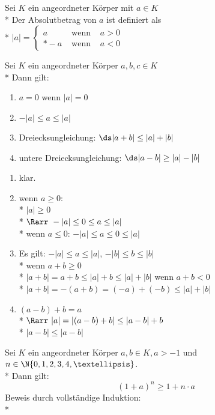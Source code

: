 	Sei $K$ ein angeordneter Körper mit $a \in K$\\*
	Der Absolutbetrag von $a$ ist definiert als \\*
	$|a| = \left\lbrace \begin{array}{rcr}
	a&\text{ wenn }&a > 0\\*
	-a&\text{ wenn }&a < 0
	\end{array}\right.$

	Sei $K$ ein angeordneter Körper $a, b, c \in K$\\*
	Dann gilt:
	\begin{enumerate}
	\item{$a = 0$ wenn $|a| = 0$}
	\item{$-|a| \leq a \leq |a|$}
	\item{Dreiecksungleichung: $\ds |a + b| \leq |a| + |b|$}
	\item{untere Dreiecksungleichung: $\ds |a - b| \geq |a| - |b|$}
	\end{enumerate}
\bew
	\begin{enumerate}
	\item{klar.}
	\item{wenn $a \geq 0$:\\*
	$|a| \geq 0$\\*
	$\Rarr\ -|a| \leq 0 \leq a \leq |a|$\\*
	wenn $a \leq 0$:
	$-|a| \leq a \leq 0 \leq |a|$}
	\item{Es gilt: $-|a| \leq a \leq |a|$, $-|b| \leq b \leq |b|$\\*
	wenn $a + b \geq 0$\\*
	$|a + b| = a + b \leq |a| + b \leq |a| + |b|$
	wenn $a + b < 0$\\*
	$|a + b| = -(a + b) = (-a) + (-b) \leq |a| + |b|$}
	\item{$(a - b) + b = a$\\*
	$\Rarr\ |a| = |(a - b) + b| \leq |a - b| + b$\\*
	$|a - b| \leq |a - b|$} %
	\end{enumerate}

	Sei $K$ ein angeordneter Körper $a, b \in K, a > -1$ und $n \in \N \{0, 1, 2, 3, 4, …\}$.\\*
	Dann gilt:
	$$(1 + a)^n \geq 1 + n \cdot a$$
	Beweis durch vollständige Induktion:\\*

